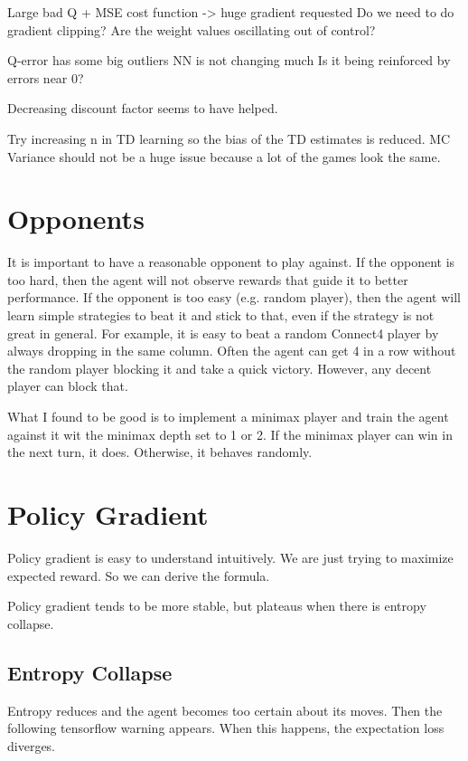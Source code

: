 \documentclass[12pt]{article}
\begin{document}
	Large bad Q + MSE cost function -> huge gradient requested
	Do we need to do gradient clipping?
	Are the weight values oscillating out of control?
	
	
	
	Q-error has some big outliers
	NN is not changing much
	Is it being reinforced by errors near 0?
	
	
	Decreasing discount factor seems to have helped.
	
	Try increasing n in TD learning so the bias of the TD estimates is reduced.
	MC Variance should not be a huge issue because a lot of the games look the same.
	
	\section{Opponents}
	
	It is important to have a reasonable opponent to play against. If the opponent is too hard, then the agent will not observe rewards that guide it to better performance. If the opponent is too easy (e.g. random player), then the agent will learn simple strategies to beat it and stick to that, even if the strategy is not great in general. For example, it is easy to beat a random Connect4 player by always dropping in the same column. Often the agent can get 4 in a row without the random player blocking it and take a quick victory. However, any decent player can block that.
	
	What I found to be good is to implement a minimax player and train the agent against it wit the minimax depth set to 1 or 2. If the minimax player can win in the next turn, it does. Otherwise, it behaves randomly. 
	
	\section{Policy Gradient}
	
	Policy gradient is easy to understand intuitively. We are just trying to maximize expected reward. So we can derive the formula.
	
	Policy gradient tends to be more stable, but plateaus when there is entropy collapse.
	
	\subsection{Entropy Collapse}
	
	Entropy reduces and the agent becomes too certain about its moves. Then the following tensorflow warning appears. When this happens, the expectation loss diverges. 
	
\end{document}
